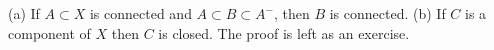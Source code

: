 (a) If $A \subset X$ is connected and $A \subset B \subset A^-$, then $B$ is connected.
(b) If $C$ is a component of $X$ then $C$ is closed.
The proof is left as an exercise.